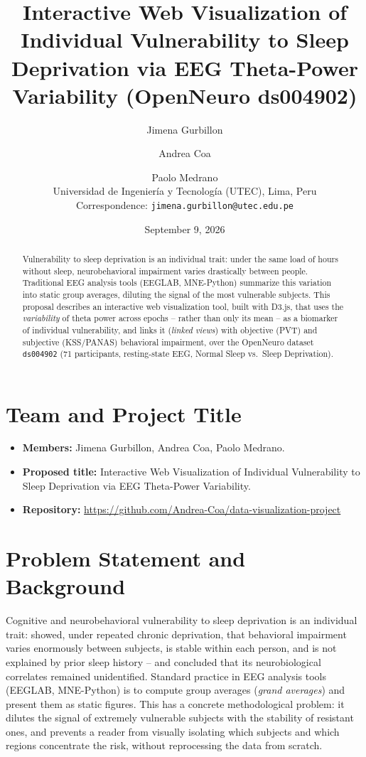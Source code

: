 \documentclass[10pt]{article}
\title{\vspace{-2.5em}\Large Interactive Web Visualization of Individual Vulnerability to Sleep Deprivation via EEG Theta-Power Variability (OpenNeuro ds004902)}
\author{\normalsize Jimena Gurbillon \and \normalsize Andrea Coa \and \normalsize Paolo Medrano \\[2pt]
\small Universidad de Ingeniería y Tecnología (UTEC), Lima, Peru \\
\small Correspondence: \texttt{jimena.gurbillon@utec.edu.pe}}
\date{\small September 9, 2026}
\begin{document}
\maketitle
\thispagestyle{fancy}

\begin{abstract}
\noindent Vulnerability to sleep deprivation is an individual trait: under the same load of hours without sleep, neurobehavioral impairment varies drastically between people. Traditional EEG analysis tools (EEGLAB, MNE-Python) summarize this variation into static group averages, diluting the signal of the most vulnerable subjects. This proposal describes an interactive web visualization tool, built with D3.js, that uses the \emph{variability} of theta power across epochs -- rather than only its mean -- as a biomarker of individual vulnerability, and links it (\emph{linked views}) with objective (PVT) and subjective (KSS/PANAS) behavioral impairment, over the OpenNeuro dataset \texttt{ds004902} (71 participants, resting-state EEG, Normal Sleep vs.\ Sleep Deprivation).
\end{abstract}

\section{Team and Project Title}
\begin{itemize}
    \item \textbf{Members:} Jimena Gurbillon, Andrea Coa, Paolo Medrano.
    \item \textbf{Proposed title:} Interactive Web Visualization of Individual Vulnerability to Sleep Deprivation via EEG Theta-Power Variability.
    \item \textbf{Repository:} \url{https://github.com/Andrea-Coa/data-visualization-project}
\end{itemize}

\section{Problem Statement and Background}
Cognitive and neurobehavioral vulnerability to sleep deprivation is an individual trait: \citet{vandongen2004} showed, under repeated chronic deprivation, that behavioral impairment varies enormously between subjects, is stable within each person, and is not explained by prior sleep history -- and concluded that its neurobiological correlates remained unidentified. Standard practice in EEG analysis tools (EEGLAB, MNE-Python) is to compute group averages (\emph{grand averages}) and present them as static figures. This has a concrete methodological problem: it dilutes the signal of extremely vulnerable subjects with the stability of resistant ones, and prevents a reader from visually isolating which subjects and which regions concentrate the risk, without reprocessing the data from scratch.
\end{document}
